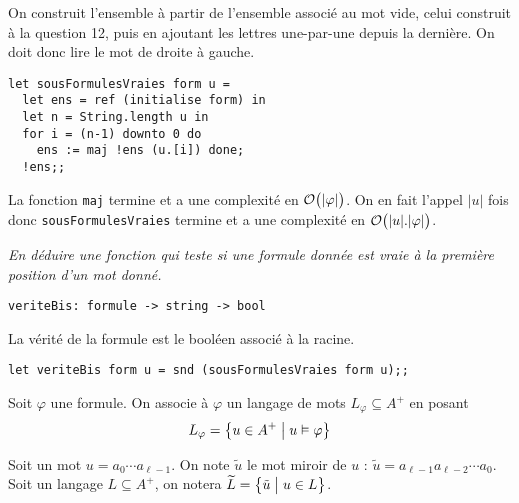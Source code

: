\begin{Answer}
On construit l'ensemble à partir de l'ensemble associé au mot vide, celui construit à la question 12, puis en ajoutant les lettres une-par-une depuis la dernière. On doit donc lire le mot de droite à gauche.

\begin{lstlisting}
let sousFormulesVraies form u = 
  let ens = ref (initialise form) in 
  let n = String.length u in
  for i = (n-1) downto 0 do 
    ens := maj !ens (u.[i]) done;
  !ens;;
\end{lstlisting}

La fonction {\tt maj} termine et a une complexité en ${\cal O}\bigl(|\varphi|\bigr)$. On en fait l'appel $|u|$ fois donc {\tt sousFormulesVraies} termine et a une complexité en ${\cal O}\bigl(|u|.|\varphi|\bigr)$.
\end{Answer}
\begin{Exercise}\it
En déduire une fonction  qui teste si une formule donnée est vraie à la première position d'un mot donné.
\begin{lstlisting}
veriteBis: formule -> string -> bool
\end{lstlisting}
\end{Exercise}
\begin{Answer}
La vérité de la formule est le booléen associé à la racine.

\begin{lstlisting}
let veriteBis form u = snd (sousFormulesVraies form u);;
\end{lstlisting}
\end{Answer}

\bigbreak

Soit $\varphi$ une formule. On associe à $\varphi$ un langage de mots $L_\varphi\subseteq A^+$ en posant 
\[L_\varphi=\bigl\{u\in A^+\bigm|u\vDash\varphi\bigr\}\]

Soit un mot $u=a_0\cdots a_{\ell-1}$. On note $\tilde u$ le mot miroir de $u$ : $\tilde u=a_{\ell-1}a_{\ell-2}\cdots a_0$. Soit un langage $L\subseteq A^+$, on notera $\widetilde L=\bigl\{\tilde u\bigm|u\in L\bigr\}$.

